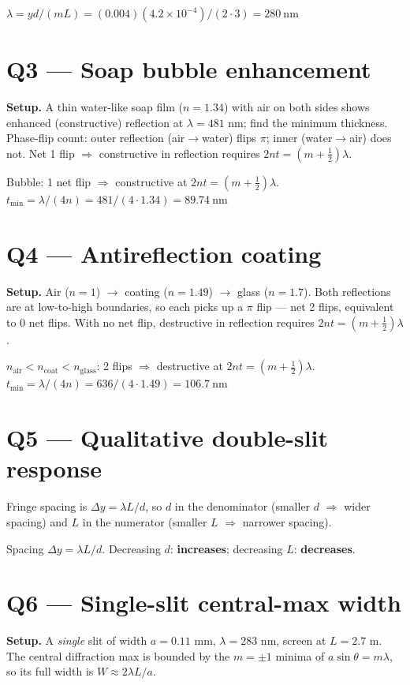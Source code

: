 \documentclass[11pt]{article}
\begin{document}
$\lambda = yd/(mL) = (0.004)(4.2\times10^{-4})/(2\cdot 3) = \boxed{280\ \text{nm}}$

\section*{Q3 --- Soap bubble enhancement}
\textbf{Setup.} A thin water-like soap film ($n=1.34$) with air on both sides shows enhanced (constructive) reflection at $\lambda=481$ nm; find the minimum thickness. Phase-flip count: outer reflection (air$\to$water) flips $\pi$; inner (water$\to$air) does not. Net 1 flip $\Rightarrow$ constructive in reflection requires $2nt = (m+\tfrac12)\lambda$.

Bubble: 1 net flip $\Rightarrow$ constructive at $2nt = (m+\tfrac12)\lambda$.
$t_{\min} = \lambda/(4n) = 481/(4\cdot 1.34) = \boxed{89.74\ \text{nm}}$

\section*{Q4 --- Antireflection coating}
\textbf{Setup.} Air ($n=1$) $\to$ coating ($n=1.49$) $\to$ glass ($n=1.7$). Both reflections are at low-to-high boundaries, so each picks up a $\pi$ flip --- net 2 flips, equivalent to 0 net flips. With no net flip, destructive in reflection requires $2nt = (m+\tfrac12)\lambda$.

$n_{\text{air}}<n_{\text{coat}}<n_{\text{glass}}$: 2 flips $\Rightarrow$ destructive at $2nt = (m+\tfrac12)\lambda$.
$t_{\min} = \lambda/(4n) = 636/(4\cdot 1.49) = \boxed{106.7\ \text{nm}}$

\section*{Q5 --- Qualitative double-slit response}
Fringe spacing is $\Delta y = \lambda L/d$, so $d$ in the denominator (smaller $d$ $\Rightarrow$ wider spacing) and $L$ in the numerator (smaller $L$ $\Rightarrow$ narrower spacing).

Spacing $\Delta y = \lambda L/d$. Decreasing $d$: \textbf{increases}; decreasing $L$: \textbf{decreases}.

\section*{Q6 --- Single-slit central-max width}
\textbf{Setup.} A \emph{single} slit of width $a=0.11$ mm, $\lambda=283$ nm, screen at $L=2.7$ m. The central diffraction max is bounded by the $m=\pm1$ minima of $a\sin\theta = m\lambda$, so its full width is $W \approx 2\lambda L/a$.
\end{document}
